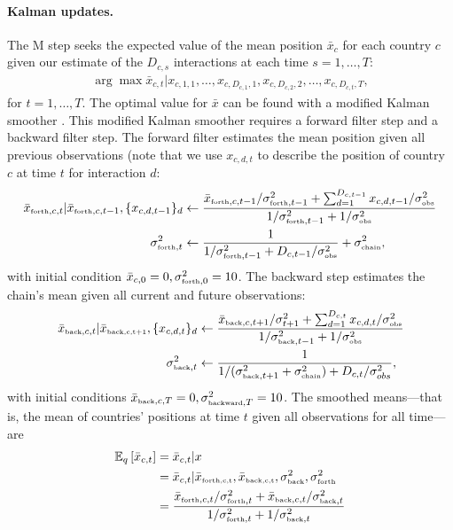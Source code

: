\paragraph{Kalman updates.}
The M step seeks the expected value of the mean position $\bar x_c$
for each country $c$ given our estimate of the $D_{c,s}$ interactions
at each time $s=1, \ldots, T$:
\begin{align}
  \arg \max \bar x_{c,t} | x_{c,1,1}, \ldots, x_{c,D_{c,1},1}, x_{c,D_{c,2},2},
  \ldots, x_{c,D_{c,t},T},
\end{align}
for $t=1, \ldots, T$. The optimal value for $\bar x$ can be found with
a modified Kalman smoother \cite{kalman:1960}.  This modified Kalman
smoother requires a forward filter step and a backward filter step.
The forward filter estimates the mean position given all previous
observations (note that we use $x_{c,d,t}$ to describe the position of
country $c$ at time $t$ for interaction $d$:
\begin{align}
  \bar x_{\mbox{\tiny forth},c,t} | \bar x_{\mbox{\tiny forth},c,t-1}, \{ x_{c,d,t-1} \}_{d}
  & \gets \frac{\bar x_{\mbox{\tiny forth},c,t-1} / \sigma_{\mbox{\tiny forth},t-1}^2
    + \sum_{d=1}^{D_{c,t-1}} x_{c,d,t-1} / \sigma_{\mbox{\tiny obs}}^2}
  {1 / \sigma_{\mbox{\tiny forth},t-1}^2 + 1 / \sigma_{\mbox{\tiny obs}}^2} \\
  \sigma_{\mbox{\tiny forth},t}^2
  & \gets \frac{1}{1 / \sigma_{\mbox{\tiny forth},t - 1}^2
    + D_{c,t-1} / \sigma_{\mbox{\tiny obs}}^2} + \sigma_{\mbox{\tiny chain}}^2,
\end{align}
with initial condition $\bar x_{c,0} = 0,
\sigma_{\mbox{\tiny forth},0}^2=10$.  The backward step estimates
the chain's mean given all current and future observations:
\begin{align}
  \bar x_{\mbox{\tiny back},c,t} | \bar x_{\mbox{\tiny back,c,t+1}}, \{ x_{c,d,t} \}_d
  & \gets \frac{\bar x_{\mbox{\tiny back},c,t+1} / \sigma_{t+1}^2
    + \sum_{d=1}^{D_{c,t}} x_{c,d,t} / \sigma_{\mbox{\tiny obs}}^2}
  {1 / \sigma_{\mbox{\tiny back},t-1}^2 + 1 / \sigma_{\mbox{\tiny obs}}^2} \nonumber \\
  \sigma_{\mbox{\tiny back},t}^2
  & \gets \frac{1}{1 / (\sigma_{\mbox{\tiny back},t + 1}^2 + \sigma_{\mbox{\tiny chain}}^2)
    + D_{c,t} / \sigma_{\tiny obs}^2},
\end{align}
with initial conditions $\bar x_{\mbox{\tiny back},c,T} = 0, \sigma_{\mbox{\tiny
    backward},T}^2=10$. The smoothed means---that is, the mean of countries' positions at time $t$ given all observations for all time---are
\begin{align}
  \mathbb{E}_q\left[\bar x_{c,t}\right] & = \bar x_{c,t} | x \nonumber \\
  & = \bar x_{c,t} | \bar x_{\mbox{\tiny forth,c,t}}, \bar x_{\mbox{\tiny back,c,t}}, \sigma_{\mbox{\tiny back}}^2, \sigma_{\mbox{\tiny forth}}^2 \nonumber \\
  & = \frac{\bar x_{\mbox{\tiny forth},c,t} / \sigma_{\mbox{\tiny forth},t}^2
    + \bar x_{\mbox{\tiny back},c,t} / \sigma_{\mbox{\tiny back},t}^2}
  {1 / \sigma_{\mbox{\tiny forth},t}^2
    + 1 / \sigma_{\mbox{\tiny back},t}^2}
\end{align}

